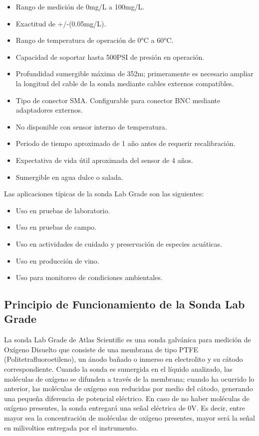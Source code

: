 \begin{itemize}
    \item Rango de medición de 0mg/L a 100mg/L.
    \item Exactitud de +/-(0.05mg/L).
    \item Rango de temperatura de operación de 0°C a 60°C.
    \item Capacidad de soportar hasta 500PSI de presión en operación.
    \item Profundidad sumergible máxima de 352m; primeramente es necesario ampliar la longitud del cable de la sonda mediante cables externos compatibles.
    \item Tipo de conector SMA. Configurable para conector BNC mediante adaptadores externos.
    \item No disponible con sensor interno de temperatura.
    \item Periodo de tiempo aproximado de 1 año antes de requerir recalibración.
    \item Expectativa de vida útil aproximada del sensor de 4 años.
    \item Sumergible en agua dulce o salada.
\end{itemize}

\clearpage

Las aplicaciones típicas de la sonda Lab Grade son las siguientes:

\begin{itemize}
    \item Uso en pruebas de laboratorio.
    \item Uso en pruebas de campo.
    \item Uso en actividades de cuidado y preservación de especies acuáticas.
    \item Uso en producción de vino.
    \item Uso para monitoreo de condiciones ambientales.
\end{itemize}

\subsection{Principio de Funcionamiento de la Sonda Lab Grade}

La sonda Lab Grade de Atlas Scientific es una sonda galvánica para medición de Oxígeno Disuelto que consiste de una membrana de tipo PTFE (Politetrafluoroetileno), un ánodo bañado o inmerso en electrolito y su cátodo correspondiente.
Cuando la sonda es sumergida en el líquido analizado, las moléculas de oxígeno se difunden a través de la membrana; cuando ha ocurrido lo anterior, las moléculas de oxígeno son reducidas por medio del cátodo, generando una 
pequeña diferencia de potencial eléctrico. En caso de no haber moléculas de oxígeno presentes, la sonda entregará una señal eléctrica de 0V. Es decir, entre mayor sea la concentración de moléculas de oxígeno presentes, mayor 
será la señal en milivoltios entregada por el instrumento.

